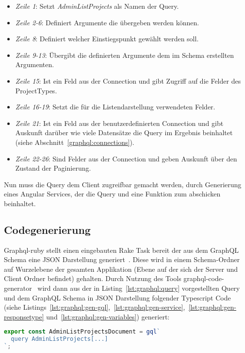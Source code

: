\begin{itemize}
	\setlength\itemsep{-1em}
	\item \emph{Zeile 1}: Setzt \emph{AdminListProjects} als Namen der Query.
	\item \emph{Zeile 2-6}: Definiert Argumente die übergeben werden können.
	\item \emph{Zeile 8}: Definiert welcher Einstiegspunkt gewählt werden soll.
	\item \emph{Zeile 9-13}: Übergibt die definierten Argumente dem im Schema erstellten Argumenten.
	\item \emph{Zeile 15}: Ist ein Feld aus der Connection und gibt Zugriff auf die Felder des ProjectTypes.
	\item \emph{Zeile 16-19}: Setzt die für die Listendarstellung verwendeten Felder.
	\item \emph{Zeile 21}: Ist ein Feld aus der benutzerdefinierten Connection und gibt Auskunft darüber wie viele Datensätze die Query im Ergebnis beinhaltet (siehe Abschnitt~\ref{graphql:connections}).
	\item \emph{Zeile 22-26}: Sind Felder aus der Connection und geben Auskunft über den Zustand der Paginierung.
\end{itemize}

Nun muss die Query dem Client zugreifbar gemacht werden, durch Generierung eines Angular Services, der die Query und eine Funktion zum abschicken beinhaltet.

\subsection{Codegenerierung}
\label{impl:graphql:generation}
Graphql-ruby stellt einen eingebauten Rake Task bereit der aus dem GraphQL Schema eine JSON Darstellung generiert~\cite{graphql-rake-task}. Diese wird in einem Schema-Ordner auf Wurzelebene der gesamten Applikation (Ebene auf der sich der Server und Client Ordner befindet) gehalten.
Durch Nutzung des Tools graphql-code-generator~\cite{graphql-code-generator} wird dann aus der in Listing~\ref{lst:graphql:query} vorgestellten Query und dem GraphQL Schema in JSON Darstellung folgender Typescript Code (siehe Listings~\ref{lst:graphql:gen-gql},~\ref{lst:graphql:gen-service},~\ref{lst:graphql:gen-responsetype} und~\ref{lst:graphql:gen-variables}) generiert:

\begin{lstlisting}[language=JavaScript,float=h!,caption={Generierter Aufruf der gql-Funktion erhält die AdminListProjects Query als String}, label={lst:graphql:gen-gql}]
export const AdminListProjectsDocument = gql`
  query AdminListProjects[...]
`;
\end{lstlisting}

